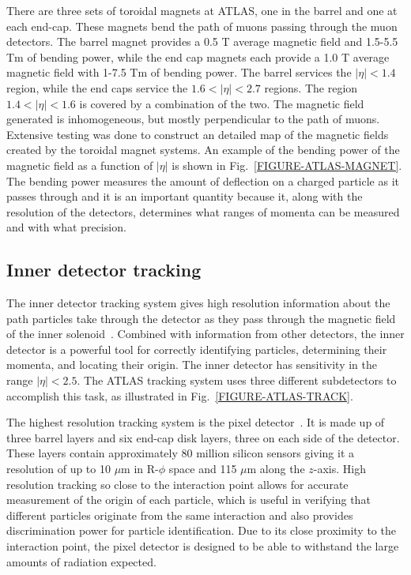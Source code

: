 There are three sets of toroidal magnets at ATLAS, one in the barrel and one at each end-cap. These magnets bend the path of muons passing through the muon detectors. The barrel magnet provides a 0.5 T average magnetic field and 1.5-5.5 Tm of bending power, while the end cap magnets each provide a 1.0 T average magnetic field with 1-7.5 Tm of bending power. The barrel services the $\left|\eta\right| < 1.4$ region, while the end caps service the $1.6 < \left|\eta\right| < 2.7$ regions. The region $1.4 < \left|\eta\right| < 1.6$ is covered by a combination of the two. The magnetic field generated is inhomogeneous, but mostly perpendicular to the path of muons. Extensive testing was done to construct an detailed map of the magnetic fields created by the toroidal magnet systems. An example of the bending power of the magnetic field as a function of $\left|\eta\right|$ is shown in Fig.~\ref{FIGURE-ATLAS-MAGNET}. The bending power measures the amount of deflection on a charged particle as it passes through and it is an important quantity because it, along with the resolution of the detectors, determines what ranges of momenta can be measured and with what precision.

\subsection{Inner detector tracking}
\label{SECTION-ATLAS-TRACK}

The inner detector tracking system gives high resolution information about the path particles take through the detector as they pass through the magnetic field of the inner solenoid~\cite{INNERDET}. Combined with information from other detectors, the inner detector is a powerful tool for correctly identifying particles, determining their momenta, and locating their origin. The inner detector has sensitivity in the range $\left|\eta\right| <2.5$. The ATLAS tracking system uses three different subdetectors to accomplish this task, as illustrated in Fig.~\ref{FIGURE-ATLAS-TRACK}. 




The highest resolution tracking system is the pixel detector~\cite{PIXEL-DET}. It is made up of three barrel layers and six end-cap disk layers, three on each side of the detector. These layers contain approximately 80 million silicon sensors giving it a resolution of up to 10 $\mu$m in R-$\phi$ space and 115 $\mu$m along the $z$-axis. High resolution tracking so close to the interaction point allows for accurate measurement of the origin of each particle, which is useful in verifying that different particles originate from the same interaction and also provides discrimination power for particle identification. Due to its close proximity to the interaction point, the pixel detector is designed to be able to withstand the large amounts of radiation expected. 

